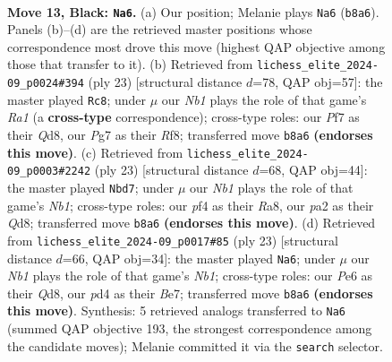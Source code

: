 \documentclass[11pt]{article}
\begin{document}
\clearpage

\begin{figure}[p]\centering
\begin{subfigure}{0.46\textwidth}\centering
\resizebox{\linewidth}{!}{%
\newchessgame
\chessboard[
  setfen={rnbq1rk1/1p1n1ppp/2p1p3/p2pP3/3P1P2/2N2N2/PPP3PP/2RQKB1R b K - 1 13},
  showmover=false,
  pgfstyle=straightmove, color=movearrow, markmove={b8-a6}
]}
\caption{}
\end{subfigure}\hfill
\begin{subfigure}{0.46\textwidth}\centering
\resizebox{\linewidth}{!}{%
\newchessgame
\chessboard[
  setfen={r2q1rk1/3bppbp/p1np1np1/1p6/3PP3/2N2N1P/PPB2PP1/R1BQR1K1 b - - 1 12},
  showmover=false,
  pgfstyle=straightmove, color=movearrow, markmove={a8-c8}
]}
\caption{}
\end{subfigure}
\\[4pt]
\begin{subfigure}{0.46\textwidth}\centering
\resizebox{\linewidth}{!}{%
\newchessgame
\chessboard[
  setfen={rn1q1rk1/4ppbp/2pp1np1/1p6/p2PP3/2P2N1P/PPB2PP1/R1BQR1K1 b - - 2 12},
  showmover=false,
  pgfstyle=straightmove, color=movearrow, markmove={b8-d7}
]}
\caption{}
\end{subfigure}\hfill
\begin{subfigure}{0.46\textwidth}\centering
\resizebox{\linewidth}{!}{%
\newchessgame
\chessboard[
  setfen={rn1q1rk1/3nbppp/2p1p3/pp1pP3/3P4/3PBN1P/PP2NPP1/R2Q1RK1 b - - 1 12},
  showmover=false,
  pgfstyle=straightmove, color=movearrow, markmove={b8-a6}
]}
\caption{}
\end{subfigure}
\caption{\textbf{Move 13, Black: \texttt{Na6}.} (a) Our position; Melanie plays \texttt{Na6} (\texttt{b8a6}). Panels (b)--(d) are the retrieved master positions whose correspondence most drove this move (highest QAP objective among those that transfer to it). (b) Retrieved from \texttt{lichess\_elite\_2024-09\_p0024\#394} (ply 23) [structural distance $d$=78, QAP obj=57]: the master played \texttt{Rc8}; under $\mu$ our \emph{Nb1} plays the role of that game's \emph{Ra1} (a \textbf{cross-type} correspondence); cross-type roles: our \emph{P}f7 as their \emph{Q}d8, our \emph{P}g7 as their \emph{R}f8; transferred move \texttt{b8a6} \textbf{(endorses this move)}. (c) Retrieved from \texttt{lichess\_elite\_2024-09\_p0003\#2242} (ply 23) [structural distance $d$=68, QAP obj=44]: the master played \texttt{Nbd7}; under $\mu$ our \emph{Nb1} plays the role of that game's \emph{Nb1}; cross-type roles: our \emph{p}f4 as their \emph{R}a8, our \emph{p}a2 as their \emph{Q}d8; transferred move \texttt{b8a6} \textbf{(endorses this move)}. (d) Retrieved from \texttt{lichess\_elite\_2024-09\_p0017\#85} (ply 23) [structural distance $d$=66, QAP obj=34]: the master played \texttt{Na6}; under $\mu$ our \emph{Nb1} plays the role of that game's \emph{Nb1}; cross-type roles: our \emph{P}e6 as their \emph{Q}d8, our \emph{p}d4 as their \emph{B}e7; transferred move \texttt{b8a6} \textbf{(endorses this move)}. Synthesis: 5 retrieved analogs transferred to \texttt{Na6} (summed QAP objective 193, the strongest correspondence among the candidate moves); Melanie committed it via the \texttt{search} selector.}
\label{fig:thought-m25}
\end{figure}
\end{document}
